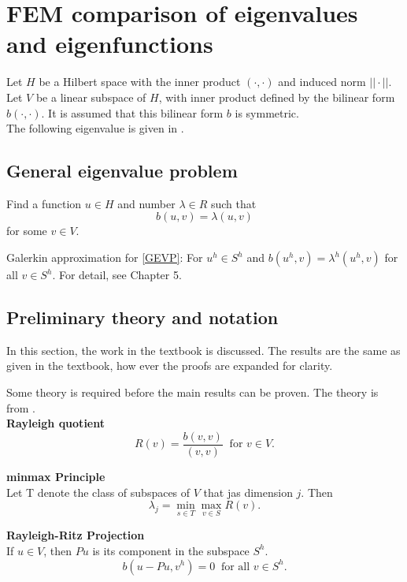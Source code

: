 \documentclass[../../main.tex]{subfiles}
\begin{document}
\section{FEM comparison of eigenvalues and eigenfunctions}


Let $H$ be a Hilbert space with the inner product $(\cdot,\cdot)$ and induced norm $||\cdot||$. Let $V$ be a linear subspace of $H$, with inner product defined by the bilinear form $b(\cdot,\cdot)$. It is assumed that this bilinear form $b$ is symmetric.\\

The following eigenvalue is given in \cite{SF73}.

\subsection{General eigenvalue problem}
Find a function $u \in H$ and number $\lambda \in R$ such that
\begin{equation}
	b(u,v) = \lambda (u,v) \label{GEVP}
\end{equation} for some $v \in V$.

Galerkin approximation for \eqref{GEVP}:
For $u^h \in S^h$ and $b(u^h, v) = \lambda^h(u^h,v)$ for all $v \in S^h$. For detail, see Chapter 5.

\subsection{Preliminary theory and notation}
In this section, the work in the textbook \cite[p.228-236]{SF73} is discussed. The results are the same as given in the textbook, how ever the proofs are expanded for clarity.

Some theory is required before the main results can be proven. The theory is from \cite{SF73}.\\

\textbf{Rayleigh quotient}
\begin{equation*}
	R(v) = \frac{b(v,v)}{(v,v)} \ \text { for } v \in V.
\end{equation*} \label{sym:Rayleigh}

\textbf{minmax Principle}\\
Let T denote the class of subspaces of $V$ that jas dimension $j$. Then
\begin{equation*}
	\lambda_j = \min_{s\in T}\max_{v \in S} R(v).
\end{equation*}

\textbf{Rayleigh-Ritz Projection}\\
If $u \in V$, then $Pu$ is its component in the subspace $S^h$.
\begin{equation*}
	b(u-Pu,v^h) = 0 \ \text{ for all } v \in S^h.
\end{equation*}
\end{document}
